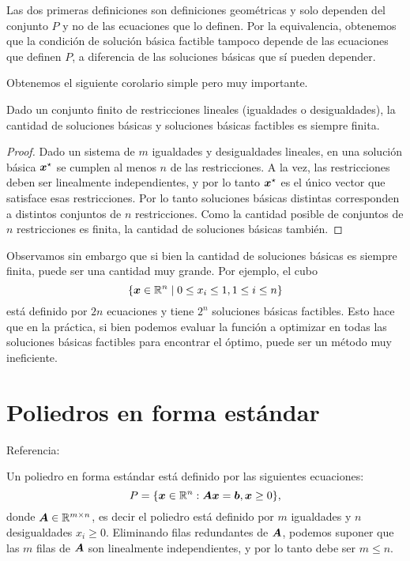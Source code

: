Las dos primeras definiciones son definiciones geométricas y solo dependen del conjunto $P$ y no de las ecuaciones que lo definen. Por la equivalencia, obtenemos que la condición de solución básica factible tampoco depende de las ecuaciones que definen $P$, a diferencia de las soluciones básicas que sí pueden depender.

Obtenemos el siguiente corolario simple pero muy importante.

\begin{coro}
Dado un conjunto finito de restricciones lineales (igualdades o desigualdades), la cantidad de soluciones básicas y soluciones básicas factibles es siempre finita.
\end{coro}

\begin{proof}
Dado un sistema de $m$ igualdades y desigualdades lineales, en una solución básica $\bm{x}^\star$ se cumplen al menos $n$ de las restricciones. A la vez, las restricciones deben ser linealmente independientes, y por lo tanto $\bm{x}^\star$ es el único vector que satisface esas restricciones. Por lo tanto soluciones básicas distintas corresponden a distintos conjuntos de $n$ restricciones. Como la cantidad posible de conjuntos de $n$ restricciones es finita, la cantidad de soluciones básicas también.
\end{proof}

Observamos sin embargo que si bien la cantidad de soluciones básicas es siempre finita, puede ser una cantidad muy grande. Por ejemplo, el cubo
$$
\{\bm{x} \in \mathbb{R}^n \mid 0 \le x_i \le 1, 1 \le i \le n\}
$$
está definido por $2n$ ecuaciones y tiene $2^n$ soluciones básicas factibles.
Esto hace que en la práctica, si bien podemos evaluar la función a optimizar en todas las soluciones básicas factibles para encontrar el óptimo, puede ser un método muy ineficiente.

\section{Poliedros en forma estándar}

\noindent Referencia: \cite[Sección 2.3]{Bertsimas1997}

Un poliedro en forma estándar está definido por las siguientes ecuaciones:
$$
P = \{\bm{x} \in \mathbb{R}^n : \bm{A}\bm{x} = \bm{b}, \bm{x} \ge 0\},
$$
donde $\bm{A} \in \mathbb{R}^{m \times n}$, es decir el poliedro está definido por $m$ igualdades y $n$ desigualdades $x_i \ge 0$.
Eliminando filas redundantes de $\bm{A}$, podemos suponer que las $m$ filas de $\bm{A}$ son linealmente independientes, y por lo tanto debe ser $m \le n$.


